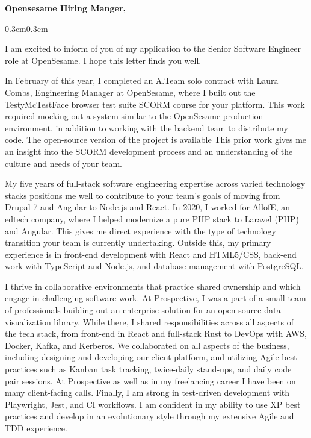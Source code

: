 \documentclass[10pt, letterpaper]{article}
\let\hrefWithoutArrow\href
\renewcommand{\href}[2]{\hrefWithoutArrow{#1}{\ifthenelse{\equal{#2}{}}{ }{#2 }\raisebox{.15ex}{\footnotesize \faExternalLink*}}}
\begin{document}
	\begin{doublespace}
		\noindent
		\textbf{Opensesame Hiring Manger,}

		\begin{adjustwidth}
			{0.3cm}{0.3cm}

			I am excited to inform of you of my application to the Senior Software Engineer
			role at OpenSesame. I hope this letter finds you well.

			In February of this year, I completed an A.Team solo contract with Laura Combs,
			Engineering Manager at OpenSesame, where I built out the TestyMcTestFace browser
			test suite SCORM course for your platform. This work required mocking out
			a system similar to the OpenSesame production environment, in addition to working
			with the backend team to distribute my code. The open-source version of
			the project is available
			\href{https://github.com/ada-x64/testy}{on my github.} This prior work
			gives me an insight into the SCORM development process and an
			understanding of the culture and needs of your team.

			My five years of full-stack software engineering expertise across varied
			technology stacks positions me well to contribute to your team's goals of
			moving from Drupal 7 and Angular to Node.js and React. In 2020, I worked
			for AllofE, an edtech company, where I helped modernize a pure PHP stack
			to Laravel (PHP) and Angular. This gives me direct experience with the type
			of technology transition your team is currently undertaking. Outside this,
			my primary experience is in front-end development with React and HTML5/CSS,
			back-end work with TypeScript and Node.js, and database management with PostgreSQL.

			I thrive in collaborative environments that practice shared ownership and which
			engage in challenging software work. At Prospective, I was a part of a small
			team of professionals building out an enterprise solution for an open-source
			data visualization library. While there, I shared responsibilities across all
			aspects of the tech stack, from front-end in React and full-stack Rust to
			DevOps with AWS, Docker, Kafka, and Kerberos. We collaborated on all
			aspects of the business, including designing and developing our client platform,
			and utilizing Agile best practices such as Kanban task tracking, twice-daily
			stand-ups, and daily code pair sessions. At Prospective as well as in my freelancing
			career I have been on many client-facing calls. Finally, I am strong in test-driven
			development with Playwright, Jest, and CI workflows. I am confident in my
			ability to use XP best practices and develop in an evolutionary style
			through my extensive Agile and TDD experience.


\end{adjustwidth}
\end{doublespace}
\end{document}

